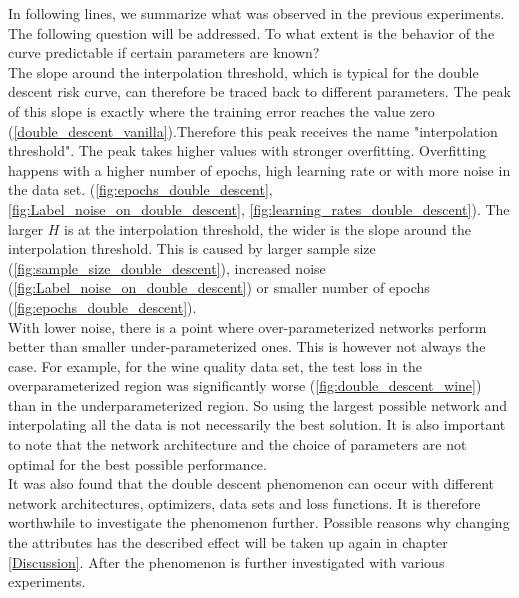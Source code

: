 In following lines, we summarize what was observed in the previous experiments.
The following question will be addressed. To what extent is the behavior of the curve predictable if certain parameters are known?\\
The slope around the interpolation threshold, which is typical for the double descent risk curve, can therefore be traced back to different parameters. The peak of this slope is exactly where the training error reaches the value zero (\ref{double_descent_vanilla}).Therefore this peak receives the name "interpolation threshold". The peak takes higher values with stronger overfitting. Overfitting happens with a higher number of epochs, high learning rate or with more noise in the data set.  (\ref{fig:epochs_double_descent}, \ref{fig:Label_noise_on_double_descent}, \ref{fig:learning_rates_double_descent}). The larger $H$ is at the interpolation threshold, the wider is the slope around the interpolation threshold.  This is caused by larger sample size (\ref{fig:sample_size_double_descent}), increased noise (\ref{fig:Label_noise_on_double_descent}) or smaller number of epochs (\ref{fig:epochs_double_descent}). \\
With lower noise, there is a point where over-parameterized networks perform better than smaller under-parameterized ones. This is however not always the case. For example, for the wine quality data set, the test loss in the overparameterized region was significantly worse (\ref{fig:double_descent_wine}) than in the underparameterized region. So using the largest possible network and interpolating all the data is not necessarily the best solution. It is also important to note that the network architecture and the choice of parameters are not optimal for the best possible performance.\\
It was also found that the double descent phenomenon can occur with different network architectures, optimizers, data sets and loss functions. It is therefore worthwhile to investigate the phenomenon further.
Possible reasons why changing the attributes has the described effect will be taken up again in chapter \ref{Discussion}. After the phenomenon is further investigated with various experiments.


